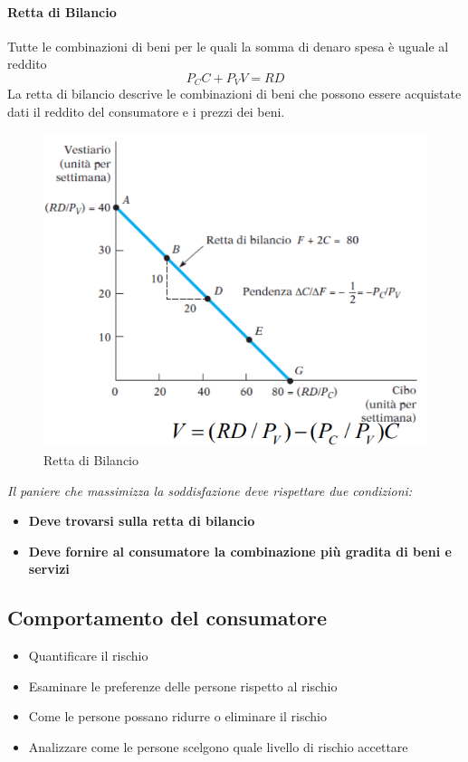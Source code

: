 \documentclass[12pt]{article}
\begin{document}
\paragraph{Retta di Bilancio}
Tutte le combinazioni di beni per le quali la somma di denaro spesa è
uguale al reddito
$$P_CC+P_VV=RD$$
La retta di bilancio descrive le combinazioni di beni che possono essere acquistate dati il reddito del consumatore e i prezzi dei beni.
\FloatBarrier
\begin{figure}[!htb]
    \centering
    \includegraphics[width=1\textwidth]{images/rBilancio.png}
    \caption{Retta di Bilancio}
\end{figure}
\textit{Il paniere che massimizza la soddisfazione deve rispettare due
    condizioni:}
\begin{itemize}
    \item \textbf{Deve trovarsi sulla retta di bilancio}
    \item \textbf{Deve fornire al consumatore la combinazione più gradita di beni e servizi}
\end{itemize}
\subsection{Comportamento del consumatore}
\begin{itemize}
    \item Quantificare il rischio
    \item Esaminare le preferenze delle persone rispetto al rischio
    \item Come le persone possano ridurre o eliminare il rischio
    \item Analizzare come le persone scelgono quale livello di rischio accettare
\end{itemize}
\end{document}
